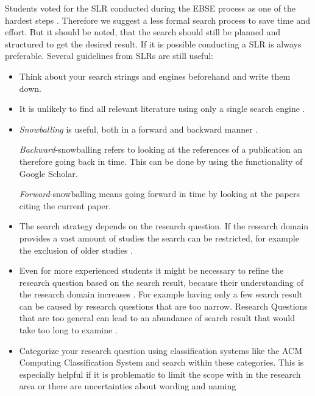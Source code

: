 Students voted for the SLR conducted during the EBSE process as one of the hardest steps \cite{keele2007}. Therefore we suggest a less formal search process to save time and effort. But it should be noted, that the search should still be planned and structured to get the desired result. If it is possible conducting a SLR is always preferable.
\newline
\newline
Several guidelines from SLRs are still useful:
\begin{itemize}
\item Think about your search strings and engines beforehand and write them down.
\item It is unlikely to find all relevant literature using only a single search engine \cite{Brereton2007}. 
\item \emph{Snowballing} is useful, both in a forward and backward manner \cite{Wohlin2014}.

\emph{Backward}-snowballing refers to looking at the references of a publication an therefore going back in time. This can be done by using the  functionality of Google Scholar.

\emph{Forward}-snowballing means going forward in time by looking at the papers citing the current paper.
\item The search strategy depends on the research question. If the research domain provides a vast amount of studies the search can  be restricted, for example the exclusion of older studies \cite{Brereton2007}.
\item Even for more experienced students it might be necessary to refine the research question based on the search result, because their understanding of the research domain increases \cite{Brereton2007}. For example having only a few search result can be caused by research questions that are too narrow. Research Questions that are too general can lead to an abundance of search result that would take too long to examine . 
\item Categorize your research question using classification systems like the ACM Computing Classification System and search within these categories. This is especially helpful if it is problematic to limit the scope with in the research area or there are uncertainties about wording and naming
\end{itemize} 

